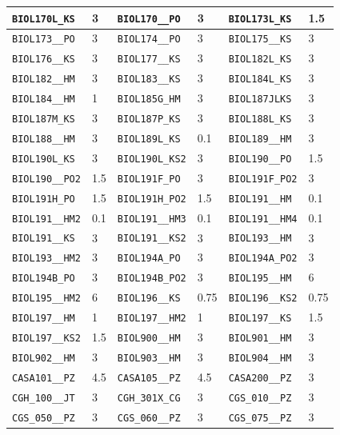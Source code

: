 \begin{longtable}{|l|l||l|l||l|l|}
    \verb|BIOL170L_KS| & 3 & \verb|BIOL170__PO| & 3 & \verb|BIOL173L_KS| & 1.5\\\hline
    \verb|BIOL173__PO| & 3 & \verb|BIOL174__PO| & 3 & \verb|BIOL175__KS| & 3\\\hline
    \verb|BIOL176__KS| & 3 & \verb|BIOL177__KS| & 3 & \verb|BIOL182L_KS| & 3\\\hline
    \verb|BIOL182__HM| & 3 & \verb|BIOL183__KS| & 3 & \verb|BIOL184L_KS| & 3\\\hline
    \verb|BIOL184__HM| & 1 & \verb|BIOL185G_HM| & 3 & \verb|BIOL187JLKS| & 3\\\hline
    \verb|BIOL187M_KS| & 3 & \verb|BIOL187P_KS| & 3 & \verb|BIOL188L_KS| & 3\\\hline
    \verb|BIOL188__HM| & 3 & \verb|BIOL189L_KS| & 0.1 & \verb|BIOL189__HM| & 3\\\hline
    \verb|BIOL190L_KS| & 3 & \verb|BIOL190L_KS2| & 3 & \verb|BIOL190__PO| & 1.5\\\hline
    \verb|BIOL190__PO2| & 1.5 & \verb|BIOL191F_PO| & 3 & \verb|BIOL191F_PO2| & 3\\\hline
    \verb|BIOL191H_PO| & 1.5 & \verb|BIOL191H_PO2| & 1.5 & \verb|BIOL191__HM| & 0.1\\\hline
    \verb|BIOL191__HM2| & 0.1 & \verb|BIOL191__HM3| & 0.1 & \verb|BIOL191__HM4| & 0.1\\\hline
    \verb|BIOL191__KS| & 3 & \verb|BIOL191__KS2| & 3 & \verb|BIOL193__HM| & 3\\\hline
    \verb|BIOL193__HM2| & 3 & \verb|BIOL194A_PO| & 3 & \verb|BIOL194A_PO2| & 3\\\hline
    \verb|BIOL194B_PO| & 3 & \verb|BIOL194B_PO2| & 3 & \verb|BIOL195__HM| & 6\\\hline
    \verb|BIOL195__HM2| & 6 & \verb|BIOL196__KS| & 0.75 & \verb|BIOL196__KS2| & 0.75\\\hline
    \verb|BIOL197__HM| & 1 & \verb|BIOL197__HM2| & 1 & \verb|BIOL197__KS| & 1.5\\\hline
    \verb|BIOL197__KS2| & 1.5 & \verb|BIOL900__HM| & 3 & \verb|BIOL901__HM| & 3\\\hline
    \verb|BIOL902__HM| & 3 & \verb|BIOL903__HM| & 3 & \verb|BIOL904__HM| & 3\\\hline
    \verb|CASA101__PZ| & 4.5 & \verb|CASA105__PZ| & 4.5 & \verb|CASA200__PZ| & 3\\\hline
    \verb|CGH_100__JT| & 3 & \verb|CGH_301X_CG| & 3 & \verb|CGS_010__PZ| & 3\\\hline
    \verb|CGS_050__PZ| & 3 & \verb|CGS_060__PZ| & 3 & \verb|CGS_075__PZ| & 3\\\hline

\end{longtable}
